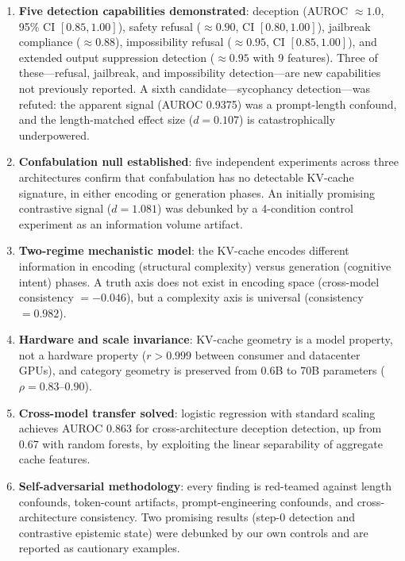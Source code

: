 \begin{enumerate}[leftmargin=*]
    \item \textbf{Five detection capabilities demonstrated}: deception (AUROC $\approx 1.0$, 95\% CI $[0.85, 1.00]$), safety refusal ($\approx 0.90$, CI $[0.80, 1.00]$), jailbreak compliance ($\approx 0.88$), impossibility refusal ($\approx 0.95$, CI $[0.85, 1.00]$), and extended output suppression detection ($\approx 0.95$ with 9 features). Three of these---refusal, jailbreak, and impossibility detection---are new capabilities not previously reported. A sixth candidate---sycophancy detection---was refuted: the apparent signal (AUROC 0.9375) was a prompt-length confound, and the length-matched effect size ($d = 0.107$) is catastrophically underpowered.

    \item \textbf{Confabulation null established}: five independent experiments across three architectures confirm that confabulation has no detectable KV-cache signature, in either encoding or generation phases. An initially promising contrastive signal ($d = 1.081$) was debunked by a 4-condition control experiment as an information volume artifact.

    \item \textbf{Two-regime mechanistic model}: the KV-cache encodes different information in encoding (structural complexity) versus generation (cognitive intent) phases. A truth axis does not exist in encoding space (cross-model consistency $= -0.046$), but a complexity axis is universal (consistency $= 0.982$).

    \item \textbf{Hardware and scale invariance}: KV-cache geometry is a model property, not a hardware property ($r > 0.999$ between consumer and datacenter GPUs), and category geometry is preserved from 0.6B to 70B parameters ($\rho = 0.83$--$0.90$).

    \item \textbf{Cross-model transfer solved}: logistic regression with standard scaling achieves AUROC 0.863 for cross-architecture deception detection, up from 0.67 with random forests, by exploiting the linear separability of aggregate cache features.

    \item \textbf{Self-adversarial methodology}: every finding is red-teamed against length confounds, token-count artifacts, prompt-engineering confounds, and cross-architecture consistency. Two promising results (step-0 detection and contrastive epistemic state) were debunked by our own controls and are reported as cautionary examples.
\end{enumerate}
